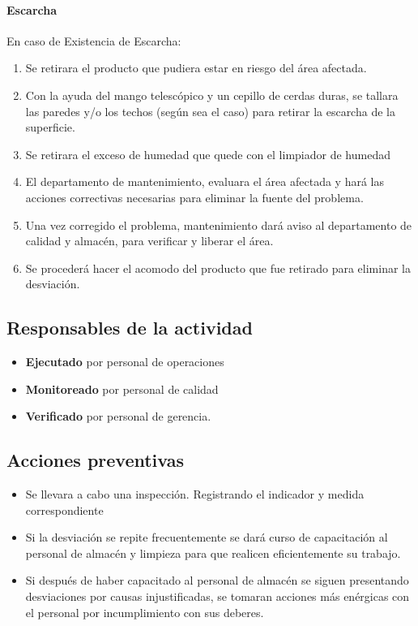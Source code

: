 \paragraph{Escarcha}

En caso de Existencia de Escarcha:

\begin{enumerate}
	\item Se retirara el producto que pudiera estar en riesgo del área afectada.
	\item Con la ayuda del mango telescópico y un cepillo de cerdas duras, se tallara las paredes y/o los techos (según sea el caso) para retirar la escarcha de la superficie.
	\item Se retirara el exceso de humedad que quede con el limpiador de humedad
	\item El departamento de mantenimiento, evaluara el área afectada y hará las acciones correctivas necesarias para eliminar la fuente del problema.
	\item Una vez corregido el problema, mantenimiento dará aviso al departamento de calidad y almacén, para verificar y liberar el área.
	\item Se procederá hacer el acomodo del producto que fue retirado para eliminar la desviación.
\end{enumerate}

\subsection{Responsables de la actividad}

\begin{itemize}
	\item \textbf{Ejecutado} por personal de operaciones
	\item \textbf{Monitoreado} por personal de calidad
	\item \textbf{Verificado} por personal de gerencia.
\end{itemize}

\subsection{Acciones preventivas}

\begin{itemize}
	\item Se llevara a cabo una inspección. Registrando el indicador y medida correspondiente
	\item Si la desviación se repite frecuentemente se dará curso de capacitación al personal de almacén y limpieza para que realicen eficientemente su trabajo.
	\item Si después de haber capacitado al personal de almacén se siguen presentando desviaciones por causas injustificadas, se tomaran acciones más enérgicas con el personal por incumplimiento con sus deberes.
\end{itemize}

